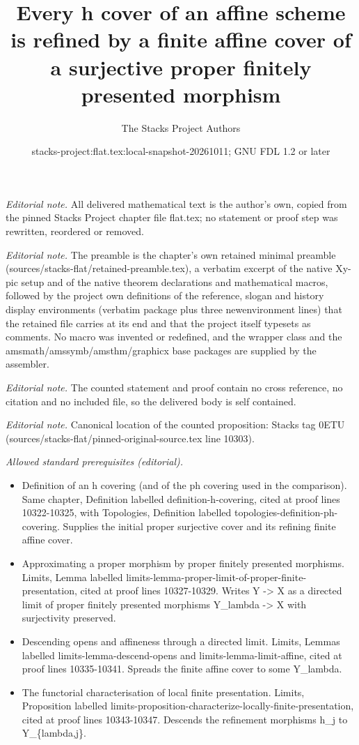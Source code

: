 \documentclass[10pt,a4paper]{amsart}
\title{Every h cover of an affine scheme is refined by a finite affine cover of a surjective proper finitely presented morphism}
\author{The Stacks Project Authors}
\date{stacks-project:flat.tex:local-snapshot-20261011; GNU FDL 1.2 or later}
\theoremstyle{plain}
\theoremstyle{definition}
\theoremstyle{remark}
\numberwithin{equation}{subsection}
\begin{document}
\maketitle
\noindent\textit{Editorial note.} All delivered mathematical text is the author's own, copied from the pinned Stacks Project chapter file flat.tex; no statement or proof step was rewritten, reordered or removed.\par\medskip
\noindent\textit{Editorial note.} The preamble is the chapter's own retained minimal preamble (sources/stacks-flat/retained-preamble.tex), a verbatim excerpt of the native Xy-pic setup and of the native theorem declarations and mathematical macros, followed by the project own definitions of the reference, slogan and history display environments (verbatim package plus three newenvironment lines) that the retained file carries at its end and that the project itself typesets as comments. No macro was invented or redefined, and the wrapper class and the amsmath/amssymb/amsthm/graphicx base packages are supplied by the assembler.\par\medskip
\noindent\textit{Editorial note.} The counted statement and proof contain no cross reference, no citation and no included file, so the delivered body is self contained.\par\medskip
\noindent\textit{Editorial note.} Canonical location of the counted proposition: Stacks tag 0ETU (sources/stacks-flat/pinned-original-source.tex line 10303).\par\medskip
\noindent\textit{Allowed standard prerequisites (editorial).}\begin{itemize}
\item Definition of an h covering (and of the ph covering used in the comparison). Same chapter, Definition labelled definition-h-covering, cited at proof lines 10322-10325, with Topologies, Definition labelled topologies-definition-ph-covering. Supplies the initial proper surjective cover and its refining finite affine cover.
\item Approximating a proper morphism by proper finitely presented morphisms. Limits, Lemma labelled limits-lemma-proper-limit-of-proper-finite-presentation, cited at proof lines 10327-10329. Writes Y -> X as a directed limit of proper finitely presented morphisms Y\_lambda -> X with surjectivity preserved.
\item Descending opens and affineness through a directed limit. Limits, Lemmas labelled limits-lemma-descend-opens and limits-lemma-limit-affine, cited at proof lines 10335-10341. Spreads the finite affine cover to some Y\_lambda.
\item The functorial characterisation of local finite presentation. Limits, Proposition labelled limits-proposition-characterize-locally-finite-presentation, cited at proof lines 10343-10347. Descends the refinement morphisms h\_j to Y\_\{lambda,j\}.
\end{itemize}\medskip
\end{document}

